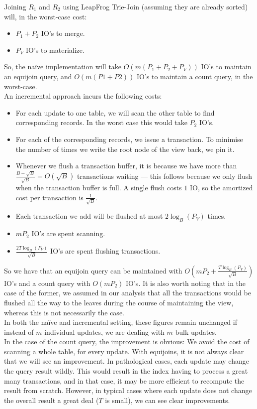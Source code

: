 Joining $R_1$ and $R_2$ using LeapFrog Trie-Join (assuming they are already sorted) will, in the worst-case cost:
\begin{itemize}
  \item $P_1 + P_2$ IO's to merge.
  \item $P_V$ IO's to materialize.
\end{itemize}
So, the na\"ive implementation will take $O(m(P_1 + P_2 + P_V))$ IO's to maintain an equijoin query, and $O(m(P1 + P2))$ IO's to maintain a count query, in the worst-case.\\[1em]

An incremental approach incurs the following costs:
\begin{itemize}
  \item For each update to one table, we will scan the other table to find corresponding records. In the worst case this would take $P_2$ IO's.
  \item For each of the corresponding records, we issue a transaction. To minimise the number of times we write the root node of the view back, we pin it.
  \item Whenever we flush a transaction buffer, it is because we have more than $\frac{B - \sqrt{B}}{\sqrt{B}}=O(\sqrt{B})$ transactions waiting --- this follows because we only flush when the transaction buffer is full. A single flush costs $1$ IO, so the amortized cost per transaction is $\frac{1}{\sqrt{B}}$.
  \item Each transaction we add will be flushed at most $2\log_B(P_V)$ times.
  \item $mP_2$ IO's are spent scanning.
  \item $\frac{2T\log_B(P_V)}{\sqrt{B}}$ IO's are spent flushing transactions.
\end{itemize}

So we have that an equijoin query can be maintained with ${O(mP_2 + \frac{T\log_B(P_V)}{\sqrt{B}})}$ IO's and a count query with $O(mP_2)$ IO's. It is also worth noting that in the case of the former, we assumed in our analysis that all the transactions would be flushed all the way to the leaves during the course of maintaining the view, whereas this is not necessarily the case.\\[1em]

In both the na\"ive and incremental setting, these figures remain unchanged if instead of $m$ individual updates, we are dealing with $m$ bulk updates.\\[1em]

In the case of the count query, the improvement is obvious: We avoid the cost of scanning a whole table, for every update. With equijoins, it is not always clear that we will see an improvement. In pathological cases, each update may change the query result wildly. This would result in the index having to process a great many transactions, and in that case, it may be more efficient to recompute the result from scratch. However, in typical cases where each update does not change the overall result a great deal ($T$ is small), we can see clear improvements.

